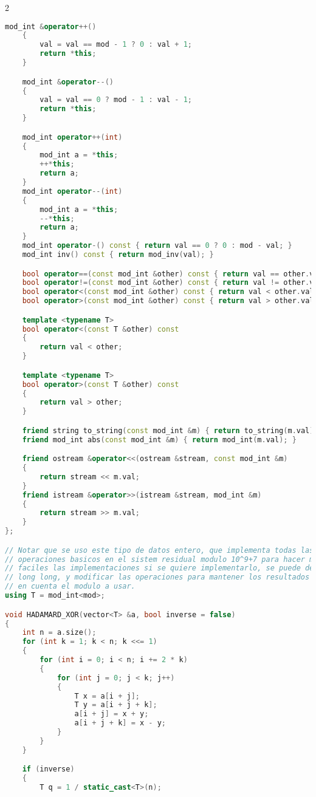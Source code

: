 \documentclass[leter]{amsart}
\begin{document}
\begin{multicols}{2}
\begin{lstlisting}[language=C++]
    mod_int &operator++()
    {
        val = val == mod - 1 ? 0 : val + 1;
        return *this;
    }

    mod_int &operator--()
    {
        val = val == 0 ? mod - 1 : val - 1;
        return *this;
    }

    mod_int operator++(int)
    {
        mod_int a = *this;
        ++*this;
        return a;
    }
    mod_int operator--(int)
    {
        mod_int a = *this;
        --*this;
        return a;
    }
    mod_int operator-() const { return val == 0 ? 0 : mod - val; }
    mod_int inv() const { return mod_inv(val); }

    bool operator==(const mod_int &other) const { return val == other.val; }
    bool operator!=(const mod_int &other) const { return val != other.val; }
    bool operator<(const mod_int &other) const { return val < other.val; }
    bool operator>(const mod_int &other) const { return val > other.val; }

    template <typename T>
    bool operator<(const T &other) const
    {
        return val < other;
    }

    template <typename T>
    bool operator>(const T &other) const
    {
        return val > other;
    }

    friend string to_string(const mod_int &m) { return to_string(m.val); }
    friend mod_int abs(const mod_int &m) { return mod_int(m.val); }

    friend ostream &operator<<(ostream &stream, const mod_int &m)
    {
        return stream << m.val;
    }
    friend istream &operator>>(istream &stream, mod_int &m)
    {
        return stream >> m.val;
    }
};

// Notar que se uso este tipo de datos entero, que implementa todas las
// operaciones basicos en el sistem residual modulo 10^9+7 para hacer mas
// faciles las implementaciones si se quiere implementarlo, se puede dejar en
// long long, y modificar las operaciones para mantener los resultados teneindo
// en cuenta el modulo a usar.
using T = mod_int<mod>;

void HADAMARD_XOR(vector<T> &a, bool inverse = false)
{
    int n = a.size();
    for (int k = 1; k < n; k <<= 1)
    {
        for (int i = 0; i < n; i += 2 * k)
        {
            for (int j = 0; j < k; j++)
            {
                T x = a[i + j];
                T y = a[i + j + k];
                a[i + j] = x + y;
                a[i + j + k] = x - y;
            }
        }
    }

    if (inverse)
    {
        T q = 1 / static_cast<T>(n);


\end{lstlisting}
\end{multicols}
\end{document}

